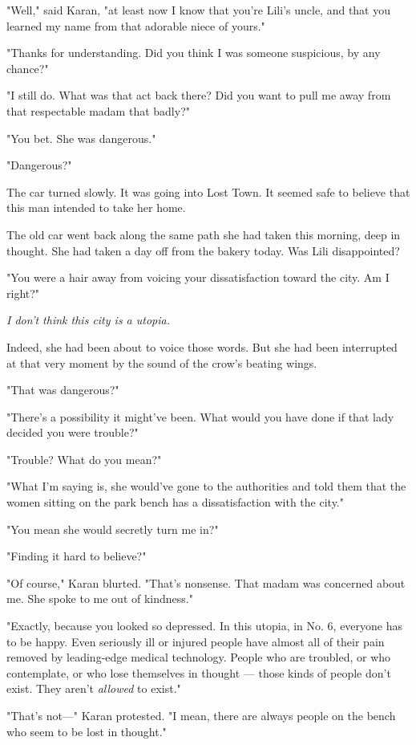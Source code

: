 "Well," said Karan, "at least now I know that you're Lili's uncle, and
that you learned my name from that adorable niece of yours."

"Thanks for understanding. Did you think I was someone suspicious, by
any chance?"

"I still do. What was that act back there? Did you want to pull me away
from that respectable madam that badly?"

"You bet. She was dangerous."

"Dangerous?"

The car turned slowly. It was going into Lost Town. It seemed safe to
believe that this man intended to take her home.

The old car went back along the same path she had taken this morning,
deep in thought. She had taken a day off from the bakery today. Was Lili
disappointed?

"You were a hair away from voicing your dissatisfaction toward the city.
Am I right?"

\emph{I don't think this city is a utopia.}

Indeed, she had been about to voice those words. But she had been
interrupted at that very moment by the sound of the crow's beating
wings.

"That was dangerous?"

"There's a possibility it might've been. What would you have done if
that lady decided you were trouble?"

"Trouble? What do you mean?"

"What I'm saying is, she would've gone to the authorities and told them
that the women sitting on the park bench has a dissatisfaction with the
city."

"You mean she would secretly turn me in?"

"Finding it hard to believe?"

"Of course," Karan blurted. "That's nonsense. That madam was concerned
about me. She spoke to me out of kindness."

"Exactly, because you looked so depressed. In this utopia, in No. 6,
everyone has to be happy. Even seriously ill or injured people have
almost all of their pain removed by leading-edge medical technology.
People who are troubled, or who contemplate, or who lose themselves in
thought --- those kinds of people don't exist. They aren't \emph{allowed} to
exist."

"That's not---" Karan protested. "I mean, there are always people on the
bench who seem to be lost in thought."


